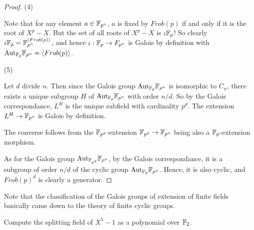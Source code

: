 \documentclass[../book.tex]{subfiles}
\begin{document}
\begin{proof}
    (4)
        
        Note that for any element $a \in \mathbb{F}_{p^n}$,
        $a$ is fixed by $Frob(p)$ if and only if it is the root of $X^p - X$. 
        But the set of all roots of $X^p - X$ is $\iota \mathbb{F}_p$!
        So clearly $\iota \mathbb{F}_p = \mathbb{F}_{p^n}^{\langle Frob(p)\rangle}$,
        and hence $\iota : \mathbb{F}_p \to F_{p^n}$ is Galois by definition 
        with $\mathrm{Aut}_{\mathbb{F}_p}\mathbb{F}_{p^n} = \langle Frob(p)\rangle$.
        
    (5)
        
        Let $d$ divide $n$.
        Then since the Galois group $\mathrm{Aut}_{\mathbb{F}_p}\mathbb{F}_{p^n}$ is isomorphic to $C_n$,
        there exists a unique subgroup $H$ 
        of $\mathrm{Aut}_{\mathbb{F}_p}\mathbb{F}_{p^n}$ with order $n/d$. 
        So by the Galois correspondance, 
        $L^H$ is the unique subfield with cardinality $p^d$.
        The extension $L^H \to \mathbb{F}_{p^n}$ is Galois by definition.
        
        The converse follows from the $\mathbb{F}_{p^d}$-extension $\mathbb{F}_{p^d} \to \mathbb{F}_{p^n}$
        being also a $\mathbb{F}_p$-extension morphism.
        
        As for the Galois group $\mathrm{Aut}_{\mathbb{F}_{p^d}}\mathbb{F}_{p^n}$,
        by the Galois correspondance, 
        it is a subgroup of order $n/d$ 
        of the cyclic group $\mathrm{Aut}_{\mathbb{F}_{p}}\mathbb{F}_{p^n}$.
        Hence, it is also cyclic, and $Frob(p)^{d}$ is clearly a generator.
        
\end{proof}
\begin{rmk}
    
    Note that the classification of the Galois groups of extension of finite fields
    basically came down to the theory of finite cyclic groups. 
    
\end{rmk}

\begin{ex}
    
    Compute the splitting field of $X^5 - 1$ as a polynomial over $\mathbb{F}_2$. 
    
\end{ex}
%
\end{document}
